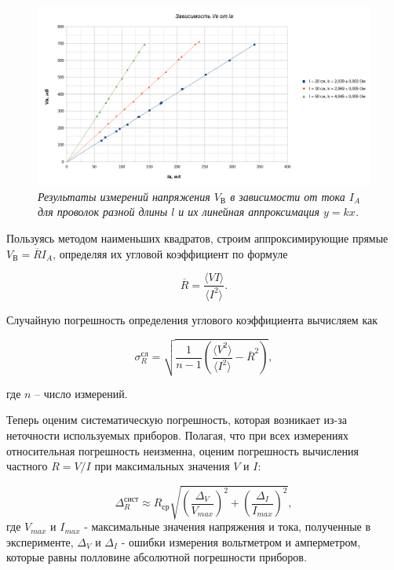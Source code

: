\documentclass[a4paper,12pt]{article}
\begin{document}
\begin{figure}[h!]
	\includegraphics[width=1\linewidth]{graphik-2.png}
	\caption{\textit{Результаты измерений напряжения $ V_\text{В} $ в зависимости от тока $ I_A $ для проволок разной длины $ l $ и их линейная аппроксимация $ y=kx $.}}
	\label{graph}
\end{figure}


\newpage

Пользуясь методом наименьших квадратов, строим аппроксимирующие прямые $ V_\text{В} = \overline{R}I_A $, определяя их угловой коэффициент по формуле

\begin{equation}
\overline{R} = \frac{\langle VI \rangle}{\langle I^2 \rangle}.
\end{equation}

Случайную погрешность определения углового коэффициента вычисляем как

\begin{equation}
\sigma^\text{сл}_R = \sqrt{\frac{1}{n-1}\left( \frac{\langle V^2\rangle}{\langle I^2 \rangle} - \overline{R}^2 \right) },
\end{equation}

где $ n $ -- число измерений.

Теперь оценим систематическую погрешность, которая возникает из-за неточности используемых приборов. Полагая, что при всех измерениях относительная погрешность неизменна, оценим погрешность вычисления частного $ R = V / I $ при максимальных значения $ V $ и $ I $:

\begin{equation}
\Delta^\text{сист}_R \approx R_\text{ср}\sqrt{\left( \frac{\Delta_V}{V_{max}} \right)^2 + \left( \frac{\Delta_I}{I_{max}} \right)^2  },
\end{equation}
где $V_{max}$ и $I_{max}$ - максимальные значения напряжения и тока, полученные в эксперименте, $\Delta_V$ и $\Delta_I$ - ошибки измерения вольтметром и амперметром, которые равны полловине абсолютной погрешности приборов.
\end{document}
